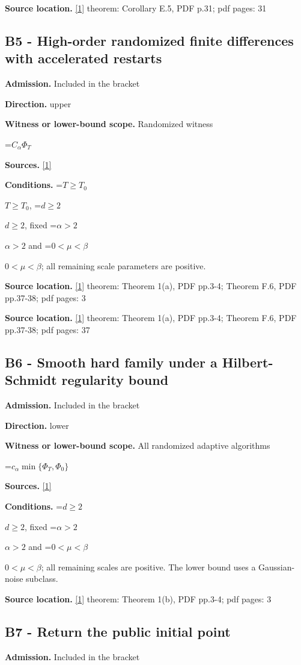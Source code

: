 \documentclass[10pt,a4paper]{article}
\newcommand{\AtlasMath}[1]{\par\begingroup\centering\setbox0=\hbox{$\displaystyle #1$}\ifdim\wd0>1.4\linewidth\typeout{ATLAS WIDE FORMULA: \the\wd0}\fi\ifdim\wd0>\linewidth\resizebox{\linewidth}{!}{\box0}\else\box0\fi\par\endgroup}
\newcommand{\AtlasInlineMath}[1]{\begingroup\setbox0=\hbox{$#1$}\ifdim\wd0>.4\linewidth\endgroup\AtlasMath{#1}\else\endgroup$#1$\fi}
\begin{document}
\textbf{Source location.} \href{https://arxiv.org/pdf/2610.05517v2}{[1]} theorem: Corollary E.5, PDF p.31; pdf pages: 31

\subsection{B5 - High-order randomized finite differences with accelerated restarts}
\textbf{Admission.} Included in the bracket

\textbf{Direction.} upper

\textbf{Witness or lower-bound scope.} Randomized witness

\AtlasMath{C_\alpha\Phi_T}
\textbf{Sources.} \href{https://arxiv.org/pdf/2610.05517v2}{[1]}

\textbf{Conditions.} \AtlasInlineMath{T\ge T_0}, \AtlasInlineMath{d\ge2}, fixed \AtlasInlineMath{\alpha>2} and \AtlasInlineMath{0<\mu<\beta}; all remaining scale parameters are positive.

\textbf{Source location.} \href{https://arxiv.org/pdf/2610.05517v2}{[1]} theorem: Theorem 1(a), PDF pp.3-4; Theorem F.6, PDF pp.37-38; pdf pages: 3

\textbf{Source location.} \href{https://arxiv.org/pdf/2610.05517v2}{[1]} theorem: Theorem 1(a), PDF pp.3-4; Theorem F.6, PDF pp.37-38; pdf pages: 37

\subsection{B6 - Smooth hard family under a Hilbert-Schmidt regularity bound}
\textbf{Admission.} Included in the bracket

\textbf{Direction.} lower

\textbf{Witness or lower-bound scope.} All randomized adaptive algorithms

\AtlasMath{c_\alpha\min\{\Phi_T,\Phi_0\}}
\textbf{Sources.} \href{https://arxiv.org/pdf/2610.05517v2}{[1]}

\textbf{Conditions.} \AtlasInlineMath{d\ge2}, fixed \AtlasInlineMath{\alpha>2} and \AtlasInlineMath{0<\mu<\beta}; all remaining scales are positive. The lower bound uses a Gaussian-noise subclass.

\textbf{Source location.} \href{https://arxiv.org/pdf/2610.05517v2}{[1]} theorem: Theorem 1(b), PDF pp.3-4; pdf pages: 3

\subsection{B7 - Return the public initial point}
\textbf{Admission.} Included in the bracket
\end{document}
